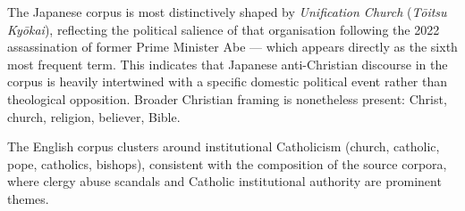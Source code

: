 \documentclass[../CLthesis.tex]{subfiles}
\begin{document}
The Japanese corpus is most distinctively shaped by \textit{Unification Church} (\textit{T\={o}itsu Ky\={o}kai}), reflecting the political salience of that organisation following the 2022 assassination of former Prime Minister Abe --- which appears directly as the sixth most frequent term. This indicates that Japanese anti-Christian discourse in the corpus is heavily intertwined with a specific domestic political event rather than theological opposition. Broader Christian framing is nonetheless present: Christ, church, religion, believer, Bible.

The English corpus clusters around institutional Catholicism (church, catholic, pope, catholics, bishops), consistent with the composition of the source corpora, where clergy abuse scandals and Catholic institutional authority are prominent themes.


\subfilebibliography
\end{document}
